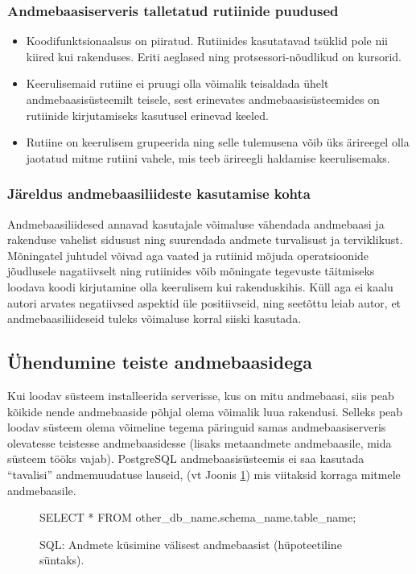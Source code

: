 \documentclass[a4paper,12pt]{article} %
\begin{document}
\subsubsection{Andmebaasiserveris talletatud rutiinide puudused}
\begin{itemize}
\item Koodifunktsionaalsus on piiratud. Rutiinides kasutatavad tsüklid pole nii kiired kui rakenduses. Eriti aeglased ning protsessori-nõudlikud on kursorid.
\item Keerulisemaid rutiine ei pruugi olla võimalik teisaldada ühelt andmebaasisüsteemilt teisele, sest erinevates andmebaasisüsteemides on rutiinide kirjutamiseks kasutusel erinevad keeled.
\item Rutiine on keerulisem grupeerida ning selle tulemusena võib üks ärireegel olla jaotatud mitme rutiini vahele, mis teeb ärireegli haldamise keerulisemaks.
\end{itemize}
\cite{StoredProcProsAndCons}

\subsubsection{Järeldus andmebaasiliideste kasutamise kohta}
Andmebaasiliidesed annavad kasutajale võimaluse vähendada andmebaasi ja rakenduse vahelist sidusust ning suurendada andmete turvalisust ja terviklikust. Mõningatel juhtudel võivad aga vaated ja rutiinid mõjuda operatsioonide jõudlusele nagatiivselt ning rutiinides võib mõningate tegevuste täitmiseks loodava koodi kirjutamine olla keerulisem kui rakenduskihis. Küll aga ei kaalu autori arvates negatiivsed aspektid üle positiivseid, ning seetõttu leiab autor, et andmebaasiliideseid tuleks võimaluse korral siiski kasutada.

\subsection{Ühendumine teiste andmebaasidega}
Kui loodav süsteem installeerida serverisse, kus on mitu andmebaasi, siis  peab kõikide nende andmebaaside põhjal olema võimalik luua rakendusi. Selleks peab loodav süsteem olema võimeline tegema päringuid samas andmebaasiserveris olevatesse teistesse andmebaasidesse (lisaks metaandmete andmebaasile, mida süsteem tööks vajab). PostgreSQL andmebaasisüsteemis ei saa kasutada ``tavalisi'' andmemuudatuse lauseid, (vt Joonis \ref{fig_sql_andmete_küsimine_välisest_andmebaasist}) mis viitaksid korraga mitmele andmebaasile.
\begin{figure}[H]
\centering
\begin{SQL}
SELECT * FROM other_db_name.schema_name.table_name;
\end{SQL}
\caption{SQL: Andmete küsimine välisest andmebaasist (hüpoteetiline süntaks).}
\label{fig_sql_andmete_küsimine_välisest_andmebaasist}
\end{figure}
\end{document}
